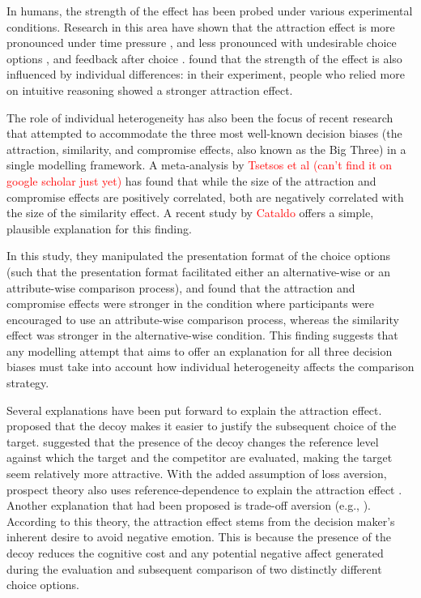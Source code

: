 \documentclass[11pt,a4paper]{article}
\begin{document}
In humans, the strength of the effect has been probed under various experimental conditions. Research in this area have shown that the attraction effect is more pronounced under time pressure \cite{Pettibone2012}, and less pronounced with undesirable choice options \cite{Malkoc2013}, and feedback after choice \cite{Ahn2015}.  found that the strength of the effect is also influenced by individual differences: in their experiment, people who relied more on intuitive reasoning showed a stronger attraction effect. 


The role of individual heterogeneity has also been the focus of recent research that attempted to accommodate the three most well-known decision biases (the attraction, similarity, and compromise effects, also known as the Big Three) in a single modelling framework. A meta-analysis by \textcolor{red}{Tsetsos et al (can't find it on google scholar just yet)} has found that while the size of the attraction and compromise effects are positively correlated, both are negatively correlated with the size of the similarity effect. A recent study by \textcolor{red}{Cataldo} offers a simple, plausible explanation for this finding. 

In this study, they manipulated the presentation format of the choice options (such that the presentation format facilitated either an alternative-wise or an attribute-wise comparison process), and found that the attraction and compromise effects were stronger in the condition where participants were encouraged to use an attribute-wise comparison process, whereas the similarity effect was stronger in the alternative-wise condition. This finding suggests that any modelling attempt that aims to offer an explanation for all three decision biases must take into account how individual heterogeneity affects the comparison strategy.


Several explanations have been put forward to explain the attraction effect.  proposed that the decoy makes it easier to justify the subsequent choice of the target. \citeauthor{Huber1982} suggested that the presence of the decoy changes the reference level against which the target and the competitor are evaluated, making the target seem relatively more attractive. With the added assumption of loss aversion, prospect theory also uses reference-dependence to explain the attraction effect \cite{Sivakumar2016}. Another explanation that had been proposed is trade-off aversion (e.g., ). According to this theory, the attraction effect stems from the decision maker's inherent desire to avoid negative emotion. This is because the presence of the decoy reduces the cognitive cost and any potential negative affect generated during the evaluation and subsequent comparison of two distinctly different choice options. 
\end{document}
